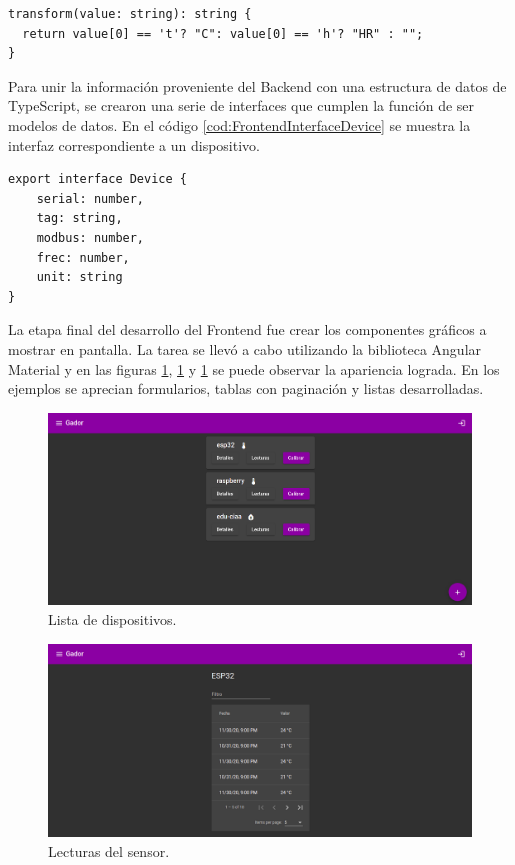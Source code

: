 \begin{lstlisting}[label=cod:FrontendUnitPipe,caption=Función de pipe de unidad]
transform(value: string): string {
  return value[0] == 't'? "C": value[0] == 'h'? "HR" : "";
}
\end{lstlisting}

Para unir la información proveniente del Backend con una estructura de datos de TypeScript, se crearon una serie de interfaces que cumplen la función de ser modelos de datos.
En el código \ref{cod:FrontendInterfaceDevice} se muestra la interfaz correspondiente a un dispositivo.

\begin{lstlisting}[label=cod:FrontendInterfaceDevice,caption=Modelo de datos de dispositivo]
export interface Device {
    serial: number,
    tag: string,
    modbus: number,
    frec: number,
    unit: string
}
\end{lstlisting}

La etapa final del desarrollo del Frontend fue crear los componentes gráficos a mostrar en pantalla.
La tarea se llevó a cabo utilizando la biblioteca Angular Material y en las figuras \ref{fig:ch3FrontendImg1}, \ref{fig:ch3FrontendImg1} y \ref{fig:ch3FrontendImg1} se puede observar la apariencia lograda.
En los ejemplos se aprecian formularios, tablas con paginación y listas desarrolladas. 

\begin{figure}[h]
	\centering
	\includegraphics[width=\textwidth]{./Figures/Dispositivos.png}
	\caption{Lista de dispositivos.}
	\label{fig:ch3FrontendImg1}
\end{figure}

\begin{figure}[h]
	\centering
	\includegraphics[width=\textwidth]{./Figures/Readings.png}
	\caption{Lecturas del sensor.}
	\label{fig:ch3FrontendImg2}
\end{figure}

